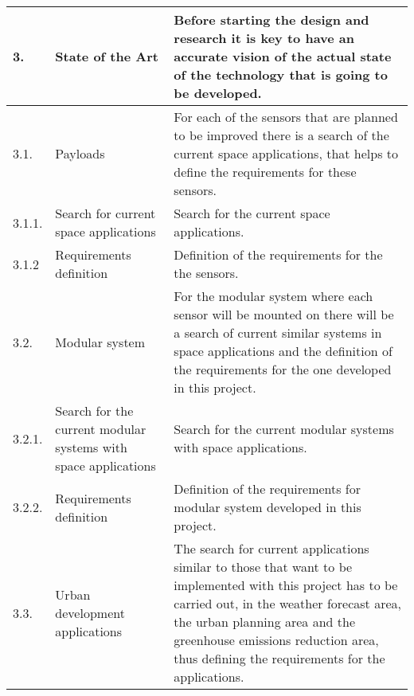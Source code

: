 \begin{longtable}[H]{l >{\raggedright\arraybackslash}p{4cm} p{8cm}}
	\midrule
	
	3. & State of the Art & Before starting the design and research it is key to have an accurate vision of the actual state of the technology that is going to be developed.\vspace{0.2cm} \\
	
	\midrule
	
	3.1. & Payloads & For each of the sensors that are planned to be improved there is a search of the current space applications, that helps to define the requirements for these sensors.\vspace{0.2cm} \\
	
	\midrule
	
	3.1.1. & Search for current space applications & Search for the current space applications.\vspace{0.2cm} \\
	
	\midrule
	
	3.1.2 & Requirements definition & Definition of the requirements for the the sensors.\vspace{0.2cm} \\
	
	\midrule
	
	3.2. & Modular system & For the modular system where each sensor will be mounted on there will be a search of current similar systems in space applications and the definition of the requirements for the one developed in this project.\vspace{0.2cm} \\
	
	\midrule
	
	3.2.1. & Search for the current modular systems with space applications & Search for the current modular systems with space applications.\vspace{0.2cm} \\
	
	\midrule
	
	3.2.2. & Requirements definition & Definition of the requirements for modular system developed in this project.\vspace{0.2cm} \\
	
	\midrule
	
	3.3. & Urban development applications & The search for current applications similar to those that want to be implemented with this project has to be carried out, in the weather forecast area, the urban planning area and the greenhouse emissions reduction area, thus defining the requirements for the applications.\vspace{0.2cm} \\
	

\end{longtable}
